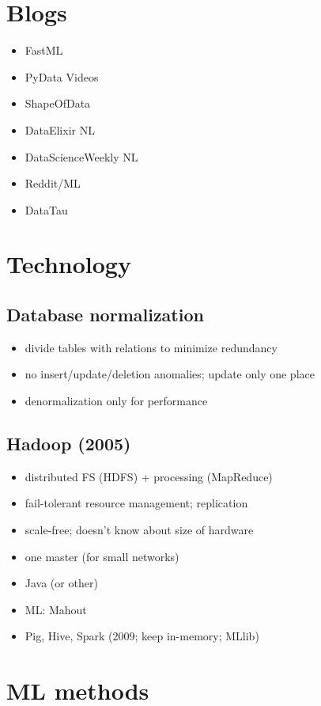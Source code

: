 \documentclass{article}
\begin{document}
\begin{multicols}{3}
\section{Blogs}
\begin{itemize}
\item FastML
\item PyData Videos
\item ShapeOfData
\item DataElixir NL
\item DataScienceWeekly NL
\item Reddit/ML
\item DataTau
\end{itemize}

\section{Technology}
\subsection{Database normalization}
\begin{itemize}
\item divide tables with relations to minimize redundancy
\item no insert/update/deletion anomalies; update only one place
\item denormalization only for performance
\end{itemize}

\subsection{Hadoop (2005)}
\begin{itemize}
\item distributed FS (HDFS) + processing (MapReduce)
\item fail-tolerant resource management; replication
\item scale-free; doesn't know about size of hardware
\item one master (for small networks)
\item Java (or other)
\item ML: Mahout
\item Pig, Hive,  Spark (2009; keep in-memory; MLlib)
\end{itemize}


\section{ML methods}

\end{multicols}
\end{document}
